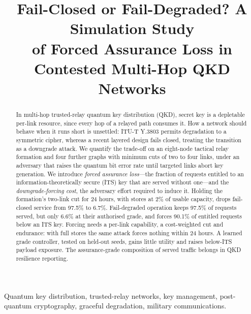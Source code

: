 \documentclass[conference,a4paper]{IEEEtran}
\begin{document}
\title{Fail-Closed or Fail-Degraded? A Simulation Study \\of Forced Assurance
Loss in Contested Multi-Hop QKD Networks}

\author{
\and
{}
}

\maketitle

\begin{abstract}
In multi-hop trusted-relay quantum key distribution (QKD), secret key is a
depletable per-link resource, since every hop of a relayed path consumes it. How a
network should behave when it runs short is unsettled: ITU-T Y.3803 permits
degradation to a symmetric cipher, whereas a recent layered design fails closed,
treating the transition as a downgrade attack. We quantify the trade-off on an
eight-node tactical relay formation and four further graphs with minimum cuts of two
to four links, under an adversary that raises the quantum bit error rate until
targeted links abort key generation. We introduce \emph{forced assurance loss}---the
fraction of requests entitled to an information-theoretically secure (ITS) key that
are served without one---and the \emph{downgrade-forcing cost}, the adversary effort
required to induce it. Holding the formation's two-link cut for 24 hours, with stores at 2\% of usable capacity, drops fail-closed service from 97.5\% to 6.7\%.
Fail-degraded operation keeps 97.5\% of requests served, but only 6.6\% at their
authorised grade, and forces 90.1\% of entitled requests below an ITS key. Forcing
needs a per-link capability, a cost-weighted cut and endurance: with full stores the
same attack forces nothing within 24 hours. A learned grade controller, tested on
held-out seeds, gains little utility and raises below-ITS payload exposure. The
assurance-grade composition of served traffic belongs in QKD resilience reporting.
\end{abstract}

\begin{IEEEkeywords}
Quantum key distribution, trusted-relay networks, key management, post-quantum
cryptography, graceful degradation, military communications.
\end{IEEEkeywords}
\end{document}
